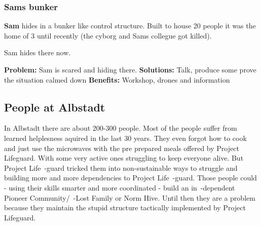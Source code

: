 \subsubsection{Sams bunker}

\textbf{Sam} hides in a bunker like control structure. Built to house 20 people it was the home of 3 until recently (the cyborg and Sams collegue got killed).

Sam hides there now.

\textbf{Problem:} Sam is scared and hiding there.
\textbf{Solutions:} Talk, produce some prove the situation calmed down
\textbf{Benefits:} Workshop, drones and information


\subsection{People at Albstadt}

In Albstadt there are about 200-300 people. Most of the people suffer from learned helplesness aquired in the last 30 years. They even forgot how to cook and just use the microwaves with the pre prepared meals offered by Project Lifeguard. With some very active ones struggling to keep everyone alive. But Project Life~-guard tricked them into non-sustainable ways to struggle and building more and more dependencies to Project Life~-guard. Those people could - using their skills smarter and more coordinated - build an in~-dependent Pioneer Community/~-Lost Family or Norm Hive. Until then they are a problem because they maintain the stupid structure tactically implemented by Project Lifeguard.

